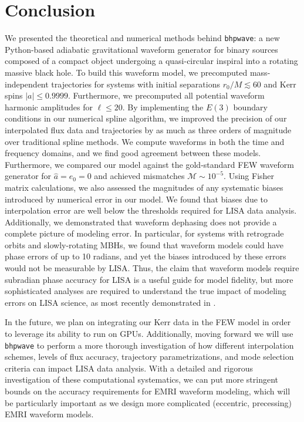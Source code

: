 \documentclass[%
 reprint,
 nofootinbib,
 amsmath,amssymb,
 aps,
 prd,
]{revtex4-2}
\begin{document}
\section{Conclusion}
\label{sec:conclusion}

We presented the theoretical and numerical methods behind \texttt{bhpwave}: a new Python-based adiabatic gravitational waveform generator for binary sources composed of a compact object undergoing a quasi-circular inspiral into a rotating massive black hole. To build this waveform model, we precomputed mass-independent trajectories for systems with initial separations $r_0/M \lesssim 60$ and Kerr spins $|a| \leq 0.9999$. Furthermore, we precomputed all potential waveform harmonic amplitudes for $\ell \leq 20$. By implementing the $E(3)$ boundary conditions in our numerical spline algorithm, we improved the precision of our interpolated flux data and trajectories by as much as three orders of magnitude over traditional spline methods. We compute waveforms in both the time and frequency domains, and we find good agreement between these models. Furthermore, we compared our model against the gold-standard FEW waveform generator for $\hat{a} = e_0 = 0$ and achieved mismatches $\mathcal{M} \sim 10^{-5}$. Using Fisher matrix calculations, we also assessed the magnitudes of any systematic biases introduced by numerical error in our model. We found that biases due to interpolation error are well below the thresholds required for LISA data analysis. Additionally, we demonstrated that waveform dephasing does not provide a complete picture of modeling error. In particular, for systems with retrograde orbits and slowly-rotating MBHs, we found that waveform models could have phase errors of up to 10 radians, and yet the biases introduced by these errors would not be measurable by LISA. Thus, the claim that waveform models require subradian phase accuracy for LISA is a useful guide for model fidelity, but more sophisticated analyses are required to understand the true impact of modeling errors on LISA science, as most recently demonstrated in \cite{BurkETC23}.

In the future, we plan on integrating our Kerr data in the FEW model in order to leverage its ability to run on GPUs. Additionally, moving forward we will use \texttt{bhpwave} to perform a more thorough investigation of how different interpolation schemes, levels of flux accuracy, trajectory parametrizations, and mode selection criteria can impact LISA data analysis. With a detailed and rigorous investigation of these computational systematics, we can put more stringent bounds on the accuracy requirements for EMRI waveform modeling, which will be particularly important as we design more complicated (eccentric, precessing) EMRI waveform models.
\end{document}

